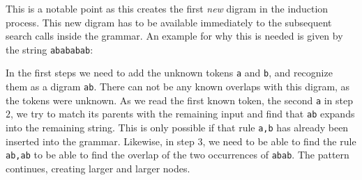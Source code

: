 This is a notable point as this creates the first \textit{new} digram in the induction process. This new digram has to be available immediately to the subsequent search calls inside the grammar. An example for why this is needed is given by the string \texttt{abababab}:\par
%
\begin{multicols}{2}
{
    \noindent In the first steps we need to add the unknown tokens \texttt{a} and \texttt{b}, and recognize them as a digram \texttt{ab}. There can not be any known overlaps with this digram, as the tokens were unknown. As we read the first known token, the second \texttt{a} in step $2$, we try to match its parents with the remaining input and find that \texttt{ab} expands into the remaining string. This is only possible if that rule \texttt{a,b} has already been inserted into the grammar. Likewise, in step $3$, we need to be able to find the rule \texttt{ab,ab} to be able to find the overlap of the two occurrences of \texttt{abab}. The pattern continues, creating larger and larger nodes.\par

}
\end{multicols}
